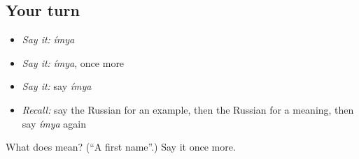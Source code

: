 \subsection*{Your turn}
\begin{itemize}
\raggedright
  \item \emph{Say it:} \emph{ímya}
  \item \emph{Say it:} \emph{ímya}, once more
  \item \emph{Say it:} say \emph{ímya}
  \item \emph{Recall:} say the Russian for an example, then the Russian for a meaning, then say \emph{ímya} again
\end{itemize}

\begin{tcolorbox}[breakable,colback=teal!4,colframe=teal!35!black,title={Before you move on}]
What does  mean? (\textquotedblleft{}A first name\textquotedblright{}.) Say it once more.
\end{tcolorbox}
